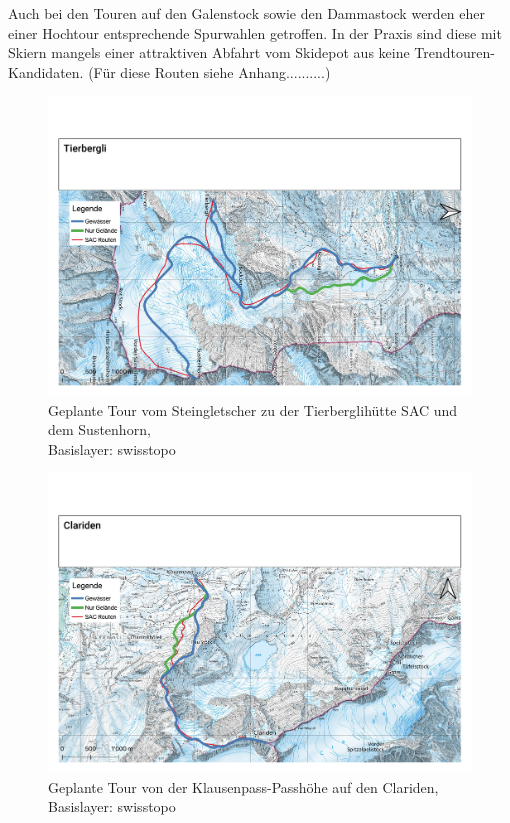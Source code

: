 Auch bei den Touren auf den Galenstock sowie den Dammastock werden eher einer Hochtour entsprechende Spurwahlen getroffen. In der Praxis sind diese mit Skiern mangels einer attraktiven Abfahrt vom Skidepot aus keine Trendtouren-Kandidaten. (Für diese Routen siehe Anhang..........)
\begin{Mappage}
{%
  \begin{figure}[H]
    \centering
    \includegraphics[page=1,width=.8\linewidth]{./../evaluation/PDFs/Tierbergli.pdf}
    \caption{Geplante Tour vom Steingletscher zu der Tierberglihütte SAC und dem Sustenhorn,\\Basislayer: swisstopo}\label{fig:tierbergli}
  \end{figure}
  \par
  \par

  \begin{figure}[H]
    \centering
    \includegraphics[page=1,width=.8\linewidth]{./../evaluation/PDFs/Clariden.pdf}
    \caption{Geplante Tour von der Klausenpass-Passhöhe auf den Clariden,\\Basislayer: swisstopo}\label{fig:clariden}
  \end{figure}
  \par
  \par
}
\end{Mappage}

